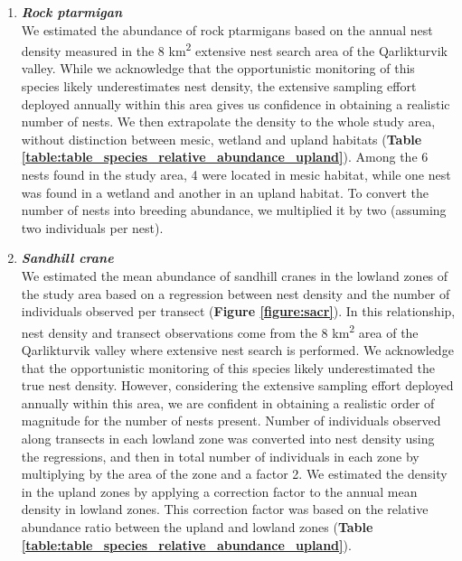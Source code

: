 \documentclass[a4paper,twoside,12pt]{article}
\begin{document}
\begin{enumerate}[label=\alph*.]
                \item[] \textit{\textbf{Rock ptarmigan}}\\
                We estimated the abundance of rock ptarmigans based on the annual nest density measured in the 8 km\textsuperscript{2} extensive nest search area of the Qarlikturvik valley. While we acknowledge that the opportunistic monitoring of this species likely underestimates nest density, the extensive sampling effort deployed annually within this area gives us confidence in obtaining a realistic number of nests. We then extrapolate the density to the whole study area, without distinction between mesic, wetland and upland habitats (\textbf{Table \ref{table:table_species_relative_abundance_upland}}). Among the 6 nests found in the study area, 4 were located in mesic habitat, while one nest was found in a wetland and another in an upland habitat. To convert the number of nests into breeding abundance, we multiplied it by two (assuming two individuals per nest).
                
                \item[] \textit{\textbf{Sandhill crane}}\\
                We estimated the mean abundance of sandhill cranes in the lowland zones of the study area based on a regression between nest density and the number of individuals observed per transect (\textbf{Figure \ref{figure:sacr}}). In this relationship, nest density and transect observations come from the 8 km\textsuperscript{2} area of the Qarlikturvik valley where extensive nest search is performed. We acknowledge that the opportunistic monitoring of this species likely underestimated the true nest density. However, considering the extensive sampling effort deployed annually within this area, we are confident in obtaining a realistic order of magnitude for the number of nests present. Number of individuals observed along transects in each lowland zone was converted into nest density using the regressions, and then in total number of individuals in each zone by multiplying by the area of the zone and a factor 2. We estimated the density in the upland zones by applying a correction factor to the annual mean density in lowland zones. This correction factor was based on the relative abundance ratio between the upland and lowland zones (\textbf{Table \ref{table:table_species_relative_abundance_upland}}). 
                

\end{enumerate}
\end{document}
